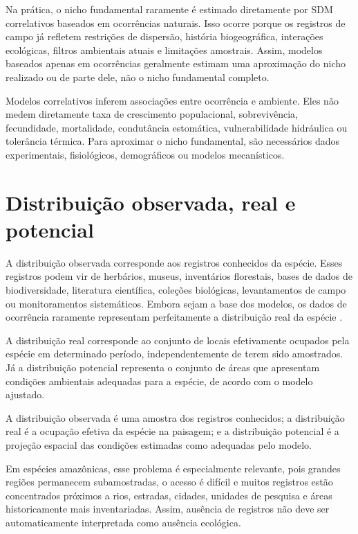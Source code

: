 \documentclass{ueap-sdm}
\begin{document}
Na prática, o nicho fundamental raramente é estimado diretamente por SDM correlativos baseados em ocorrências naturais. Isso ocorre porque os registros de campo já refletem restrições de dispersão, história biogeográfica, interações ecológicas, filtros ambientais atuais e limitações amostrais. Assim, modelos baseados apenas em ocorrências geralmente estimam uma aproximação do nicho realizado ou de parte dele, não o nicho fundamental completo.

\begin{atencao}
Modelos correlativos inferem associações entre ocorrência e ambiente. Eles não medem diretamente taxa de crescimento populacional, sobrevivência, fecundidade, mortalidade, condutância estomática, vulnerabilidade hidráulica ou tolerância térmica. Para aproximar o nicho fundamental, são necessários dados experimentais, fisiológicos, demográficos ou modelos mecanísticos.
\end{atencao}

\section{Distribuição observada, real e potencial}

A distribuição observada corresponde aos registros conhecidos da espécie. Esses registros podem vir de herbários, museus, inventários florestais, bases de dados de biodiversidade, literatura científica, coleções biológicas, levantamentos de campo ou monitoramentos sistemáticos. Embora sejam a base dos modelos, os dados de ocorrência raramente representam perfeitamente a distribuição real da espécie \parencite{hijmans2021,guisan2017habitat}.

A distribuição real corresponde ao conjunto de locais efetivamente ocupados pela espécie em determinado período, independentemente de terem sido amostrados. Já a distribuição potencial representa o conjunto de áreas que apresentam condições ambientais adequadas para a espécie, de acordo com o modelo ajustado.

\begin{conceito}
A distribuição observada é uma amostra dos registros conhecidos; a distribuição real é a ocupação efetiva da espécie na paisagem; e a distribuição potencial é a projeção espacial das condições estimadas como adequadas pelo modelo.
\end{conceito}

Em espécies amazônicas, esse problema é especialmente relevante, pois grandes regiões permanecem subamostradas, o acesso é difícil e muitos registros estão concentrados próximos a rios, estradas, cidades, unidades de pesquisa e áreas historicamente mais inventariadas. Assim, ausência de registros não deve ser automaticamente interpretada como ausência ecológica.
\end{document}
